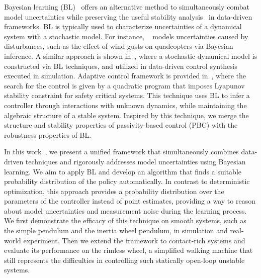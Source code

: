 Bayesian learning (BL)~\cite{gal2016improving,thakur} offers an alternative
method to simultaneously combat model uncertainties while preserving the useful
stability analysis~ in data-driven frameworks.
%
BL is typically used to characterize uncertainties of a dynamical system with a
stochastic model.
%
For instance, \cite{sadigh2015safe}~ models uncertainties caused by disturbances,
such as the effect of wind gusts on quadcopters via Bayesian inference.
%
A similar approach is shown in~\cite{shen2022online, pmlr-v54-linderman17a}, where
a stochastic dynamical model is constructed via BL techniques, and utilized in
data-driven control synthesis executed in simulation. 
%
%
%
Adaptive control framework is provided in~\cite{fan2020bayesian}, where the
search for the control is given by a quadratic program that imposes
Lyapunov stability constraint for safety critical systems.
%
This technique uses BL to infer a controller through interactions with
unknown dynamics, while maintaining the algebraic structure of a stable system.
%
Inspired by this technique, we merge the structure and stability properties of
passivity-based control (PBC) with the robustness properties of BL.  


In this work~, we present a unified framework that simultaneously combines
data-driven techniques and rigorously addresses model uncertainties using Bayesian
learning.
%
We aim to apply BL and develop an algorithm that finds a suitable probability
distribution of the policy automatically.
%
In contrast to deterministic optimization, this approach provides a probability
distribution over the parameters of the controller instead of point
estimates, providing a way to reason about model uncertainties and measurement
noise during the learning process.
%
We first demonstrate the efficacy of this technique on smooth systems, such as
the simple pendulum and the inertia wheel pendulum, in simulation and real-world
experiment.
%
Then we extend the framework to contact-rich systems and evaluate its
performance on the rimless wheel, a simplified walking machine that still
represents the difficulties in controlling such statically open-loop unstable
systems.
